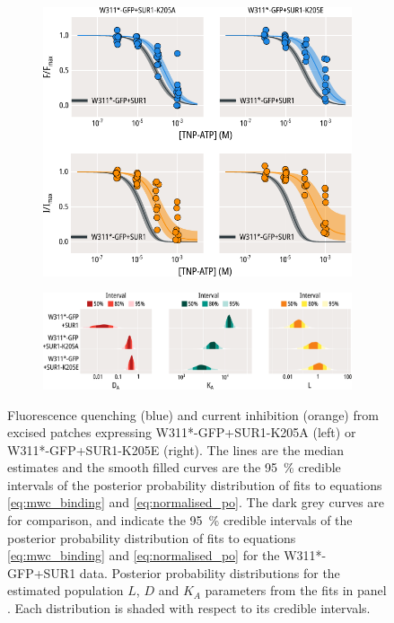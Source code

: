 \begin{figure}[hbtp]
	\centering
	\begin{subfigure}[t]{0.9\textwidth}
		\caption{}\label{ch6fig:mwc_k205_1}
		\centering
		\includegraphics[width=\textwidth]{mwc_k205_1.pdf}
	\end{subfigure}
	\vfill
	\begin{subfigure}[t]{0.9\textwidth}
		\caption{}\label{ch6fig:mwc_k205_2}
		\centering
		\includegraphics[width=\textwidth]{mwc_k205_2.pdf}
	\end{subfigure}
	\caption[K205 mutations affect gating and nucleotide binding]{
	{\bf{}}
	 Fluorescence quenching (blue) and current inhibition (orange) from excised patches expressing W311*-GFP+SUR1-K205A (left) or W311*-GFP+SUR1-K205E (right).
	The lines are the median estimates and the smooth filled curves are the \SI{95}{\percent} credible intervals of the posterior probability distribution of fits to equations \ref{eq:mwc_binding} and \ref{eq:normalised_po}.
	The dark grey curves are for comparison, and indicate the \SI{95}{\percent} credible intervals of the posterior probability distribution of fits to equations \ref{eq:mwc_binding} and \ref{eq:normalised_po} for the W311*-GFP+SUR1 data.
	 Posterior probability distributions for the estimated population $L$, $D$ and $K_A$ parameters from the fits in panel .
	Each distribution is shaded with respect to its credible intervals.
	}\label{ch6fig:k205_fig2}
\end{figure}

